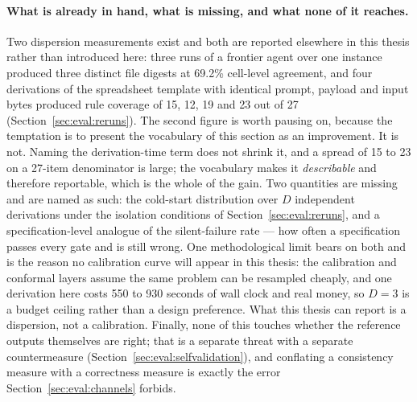 \paragraph{What is already in hand, what is missing, and what none of it reaches.}
Two dispersion measurements exist and both are reported elsewhere in this thesis rather than
introduced here: three runs of a frontier agent over one instance produced three distinct file
digests at 69.2\% cell-level agreement, and four derivations of the spreadsheet template with
identical prompt, payload and input bytes produced rule coverage of 15, 12, 19 and 23 out of 27
(Section~\ref{sec:eval:reruns}). The second figure is worth pausing on, because the temptation
is to present the vocabulary of this section as an improvement. It is not. Naming the
derivation-time term does not shrink it, and a spread of 15 to 23 on a 27-item denominator is
large; the vocabulary makes it \emph{describable} and therefore reportable, which is the whole
of the gain. Two quantities are missing and are named as such: the cold-start distribution over
$D$ independent derivations under the isolation conditions of
Section~\ref{sec:eval:reruns}, and a specification-level analogue of the silent-failure rate
--- how often a specification passes every gate and is still wrong. One methodological limit
bears on both and is the reason no calibration curve will appear in this thesis: the
calibration and conformal layers assume the same problem can be resampled cheaply, and one
derivation here costs 550 to 930 seconds of wall clock and real money, so $D=3$ is a budget
ceiling rather than a design preference. What this thesis can report is a dispersion, not a
calibration. Finally, none of this touches whether the reference outputs themselves are right;
that is a separate threat with a separate countermeasure
(Section~\ref{sec:eval:selfvalidation}), and conflating a consistency measure with a
correctness measure is exactly the error Section~\ref{sec:eval:channels} forbids.

